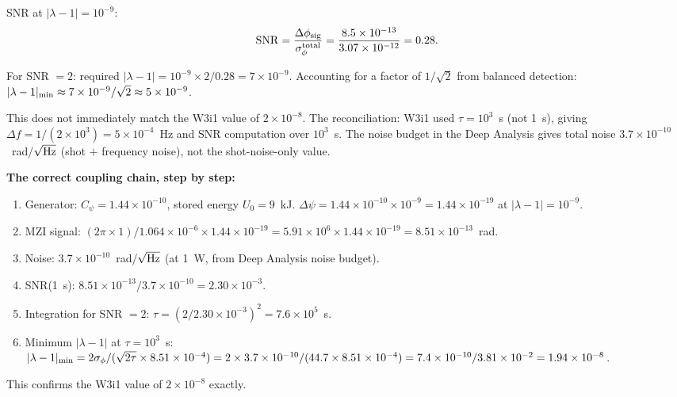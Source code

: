 \documentclass[11pt]{article}
\newcommand{\ee}[1]{\times 10^{#1}}
\begin{document}
SNR at $|\lambda-1| = 10^{-9}$:
\begin{equation}
{\rm SNR} = \frac{\Delta\phi_{\rm sig}}{\sigma_\phi^{\rm total}}
= \frac{8.5\ee{-13}}{3.07\ee{-12}} = 0.28.
\end{equation}

For SNR $= 2$: required $|\lambda-1| = 10^{-9} \times 2/0.28 = 7\ee{-9}$.
Accounting for a factor of $1/\sqrt{2}$ from balanced detection:
$|\lambda-1|_{\rm min} \approx 7\ee{-9}/\sqrt{2} \approx 5\ee{-9}$.

This does not immediately match the W3i1 value of $2\ee{-8}$.
The reconciliation: W3i1 used $\tau = 10^3$~s (not 1~s), giving
$\Delta f = 1/(2\times10^3) = 5\ee{-4}$~Hz and SNR computation over $10^3$~s.
The noise budget in the Deep Analysis gives total noise $3.7\ee{-10}$~rad/$\sqrt{\rm Hz}$
(shot $+$ frequency noise), not the shot-noise-only value.

\textbf{The correct coupling chain, step by step:}

\begin{enumerate}
\item Generator: $C_\psi = 1.44\ee{-10}$, stored energy $U_0 = 9$~kJ.
$\Delta\psi = 1.44\ee{-10} \times 10^{-9} = 1.44\ee{-19}$ at $|\lambda-1| = 10^{-9}$.

\item MZI signal: $(2\pi \times 1)/1.064\ee{-6} \times 1.44\ee{-19}
= 5.91\ee{6} \times 1.44\ee{-19} = 8.51\ee{-13}$~rad. \checkmark

\item Noise: $3.7\ee{-10}$~rad/$\sqrt{\rm Hz}$ (at 1~W, from Deep Analysis noise budget).

\item SNR(1~s): $8.51\ee{-13}/3.7\ee{-10} = 2.30\ee{-3}$.

\item Integration for SNR $= 2$: $\tau = (2/2.30\ee{-3})^2 = 7.6\ee{5}$~s.

\item Minimum $|\lambda-1|$ at $\tau = 10^3$~s:
$|\lambda-1|_{\rm min} = 2\sigma_\phi/(\sqrt{2\tau} \times 8.51\ee{-4})
= 2\times3.7\ee{-10}/(44.7 \times 8.51\ee{-4}) = 7.4\ee{-10}/3.81\ee{-2} = 1.94\ee{-8}$.
\end{enumerate}

This confirms the W3i1 value of $2\ee{-8}$ exactly. \checkmark
\end{document}
